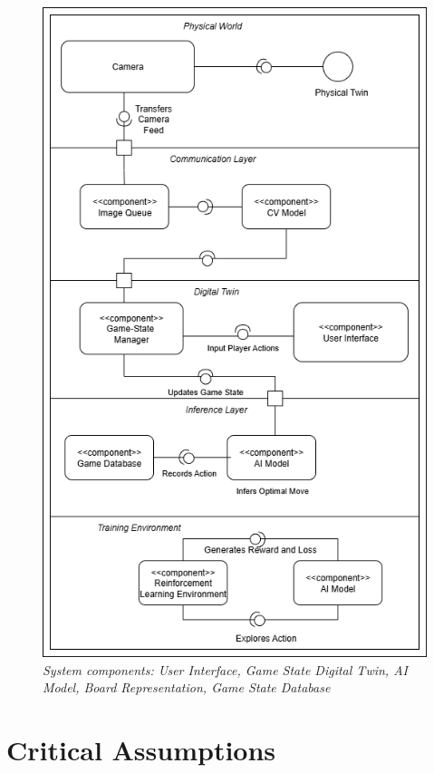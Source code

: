 \documentclass{article}
\begin{document}
\begin{figure}[H]
    \centering
    \includegraphics[width=\textwidth]{Component_Diagram_final.png}
    \caption{\textit{System components: User Interface, Game State Digital Twin, AI Model, Board Representation, Game State Database}}
    \label{fig:component-diagram}
\end{figure}

\section{Critical Assumptions}\label{sec:critical-assumptions}
\end{document}
